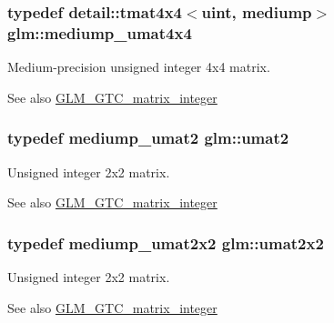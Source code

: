 \subsubsection[{\texorpdfstring{mediump\+\_\+umat4x4}{mediump_umat4x4}}]{\setlength{\rightskip}{0pt plus 5cm}typedef detail\+::tmat4x4$<$uint, mediump$>$ {\bf glm\+::mediump\+\_\+umat4x4}}\hypertarget{group__gtc__matrix__integer_ga24b1c76fefa58f810e24cafe0ea6a6a0}{}\label{group__gtc__matrix__integer_ga24b1c76fefa58f810e24cafe0ea6a6a0}
Medium-\/precision unsigned integer 4x4 matrix. \begin{DoxySeeAlso}{See also}
\hyperlink{group__gtc__matrix__integer}{G\+L\+M\+\_\+\+G\+T\+C\+\_\+matrix\+\_\+integer} 
\end{DoxySeeAlso}
\subsubsection[{\texorpdfstring{umat2}{umat2}}]{\setlength{\rightskip}{0pt plus 5cm}typedef mediump\+\_\+umat2 {\bf glm\+::umat2}}\hypertarget{group__gtc__matrix__integer_gae2d45c058cfa0b60ab4df0cdda2d8516}{}\label{group__gtc__matrix__integer_gae2d45c058cfa0b60ab4df0cdda2d8516}
Unsigned integer 2x2 matrix. \begin{DoxySeeAlso}{See also}
\hyperlink{group__gtc__matrix__integer}{G\+L\+M\+\_\+\+G\+T\+C\+\_\+matrix\+\_\+integer} 
\end{DoxySeeAlso}
\subsubsection[{\texorpdfstring{umat2x2}{umat2x2}}]{\setlength{\rightskip}{0pt plus 5cm}typedef mediump\+\_\+umat2x2 {\bf glm\+::umat2x2}}\hypertarget{group__gtc__matrix__integer_gad3c997b31dd69bdb4787867e758ed48d}{}\label{group__gtc__matrix__integer_gad3c997b31dd69bdb4787867e758ed48d}
Unsigned integer 2x2 matrix. \begin{DoxySeeAlso}{See also}
\hyperlink{group__gtc__matrix__integer}{G\+L\+M\+\_\+\+G\+T\+C\+\_\+matrix\+\_\+integer} 
\end{DoxySeeAlso}
